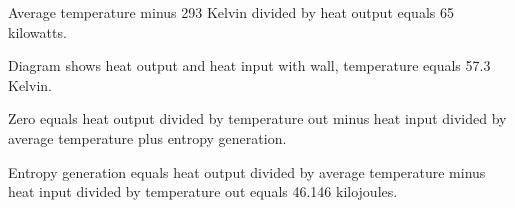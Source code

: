 Average temperature minus 293 Kelvin divided by heat output equals 65 kilowatts.

Diagram shows heat output and heat input with wall, temperature equals 57.3 Kelvin.

Zero equals heat output divided by temperature out minus heat input divided by average temperature plus entropy generation.

Entropy generation equals heat output divided by average temperature minus heat input divided by temperature out equals 46.146 kilojoules.